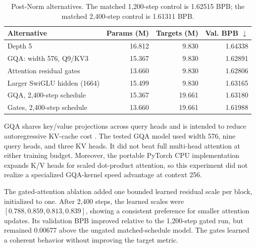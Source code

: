 \documentclass[10pt]{article}
\begin{document}
\begin{table}[t]
\centering
\small
\caption{Post-Norm alternatives. The matched 1,200-step control is 1.62515 BPB; the matched 2,400-step control is 1.61311 BPB.}
\label{tab:ablations}
\begin{tabular}{lrrr}
\toprule
Alternative & Params (M) & Targets (M) & Val. BPB $\downarrow$\\
\midrule
Depth 5 & 16.812 & 9.830 & 1.64338\\
GQA: width 576, Q9/KV3 & 15.367 & 9.830 & 1.62891\\
Attention residual gates & 13.660 & 9.830 & 1.62806\\
Larger SwiGLU hidden (1664) & 15.499 & 9.830 & 1.63165\\
GQA, 2,400-step schedule & 15.367 & 19.661 & 1.63180\\
Gates, 2,400-step schedule & 13.660 & 19.661 & 1.61988\\
\bottomrule
\end{tabular}
\end{table}

GQA shares key/value projections across query heads and is intended to reduce autoregressive KV-cache cost \cite{ainslie2023gqa}. The tested GQA model used width 576, nine query heads, and three KV heads. It did not beat full multi-head attention at either training budget. Moreover, the portable PyTorch CPU implementation expands K/V heads for scaled dot-product attention, so this experiment did not realize a specialized GQA-kernel speed advantage at context 256.

The gated-attention ablation added one bounded learned residual scale per block, initialized to one. After 2,400 steps, the learned scales were $[0.788,0.859,0.813,0.839]$, showing a consistent preference for smaller attention updates. Its validation BPB improved relative to the 1,200-step gated run, but remained 0.00677 above the ungated matched-schedule model. The gates learned a coherent behavior without improving the target metric.
\end{document}

